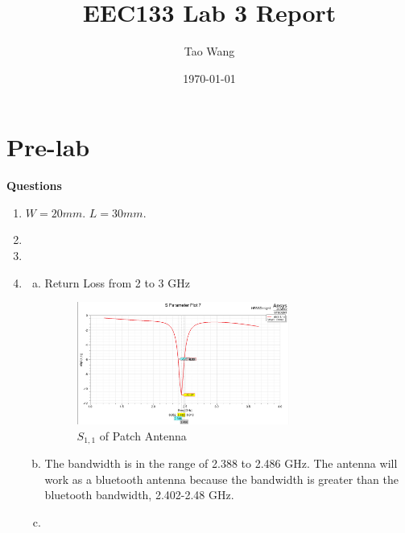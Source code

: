 \documentclass{article} %
\begin{document}
\title{EEC133 Lab 3 Report}
\author{Tao Wang}
\date{\today}

\maketitle

\section*{Pre-lab}
\textbf{Questions}
\begin{enumerate}[(1)]
    \item $W = 20 \si{mm}$. $L = 30 \si{mm}$.
    \item
    \item
    \item
          \begin{enumerate}[(a)]
              \item Return Loss from 2 to 3 GHz
                    \begin{figure}[H]
                        \centering
                        \includegraphics[width=0.7\textwidth]{./image/figure1.png}
                        \caption{$S_{1, 1}$ of Patch Antenna}
                    \end{figure}
              \item The bandwidth is in the range of 2.388 to 2.486 GHz. The antenna will work as a bluetooth antenna because the bandwidth is greater than the bluetooth bandwidth, 2.402-2.48 GHz.
              \item
          \end{enumerate}

\end{enumerate}
\end{document}
